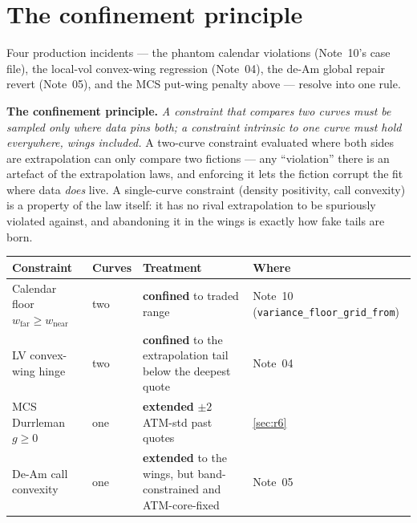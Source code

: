 \documentclass[11pt]{article}
\begin{document}
\section{The confinement principle}
\label{sec:principle}

Four production incidents --- the phantom calendar violations (Note~10's
case file), the local-vol convex-wing regression (Note~04), the de-Am global
repair revert (Note~05), and the MCS put-wing penalty above --- resolve into
one rule.

\begin{heuristic}
\textbf{The confinement principle.} \emph{A constraint that compares two
curves must be sampled only where data pins both; a constraint intrinsic to
one curve must hold everywhere, wings included.} A two-curve constraint
evaluated where both sides are extrapolation can only compare two fictions
--- any ``violation'' there is an artefact of the extrapolation laws, and
enforcing it lets the fiction corrupt the fit where data \emph{does} live. A
single-curve constraint (density positivity, call convexity) is a property of
the law itself: it has no rival extrapolation to be spuriously violated
against, and abandoning it in the wings is exactly how fake tails are born.
\end{heuristic}

\begin{center}
\small
\begin{tabular}{p{}p{}p{}p{}}
\toprule
Constraint & Curves & Treatment & Where\\
\midrule
Calendar floor $w_{\text{far}}\ge w_{\text{near}}$ & two &
\textbf{confined} to traded range & Note~10
(\nolinkurl{variance_floor_grid_from})\\
LV convex-wing hinge & two\footnotemark & \textbf{confined} to the
extrapolation tail below the deepest quote & Note~04\\
MCS Durrleman $g\ge0$ & one & \textbf{extended} $\pm2$ ATM-std past quotes &
\cref{sec:r6}\\
De-Am call convexity & one & \textbf{extended} to the wings, but
band-constrained and ATM-core-fixed & Note~05\\
\bottomrule
\end{tabular}
\end{center}
\end{document}
